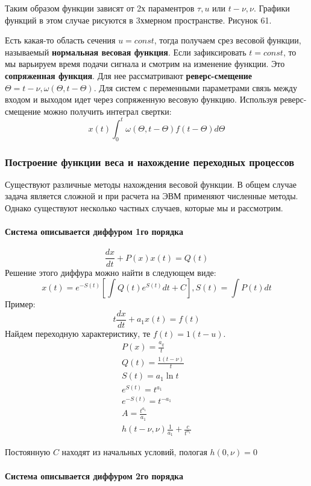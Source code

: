 Таким образом функции зависят от 2х параментров $\tau,
u$ или $t-\nu,\nu$. Графики функций в этом случае рисуются в 3хмерном пространстве.
Рисунок 61.

Есть какая-то область сечения $
u=const$, тогда получаем срез весовой функции, называемый \textbf{нормальная весовая функция}. Если зафиксировать $t=const$, то мы варьируем время подачи сигнала и смотрим на изменение функции. Это \textbf{сопряженная функция}. Для нее рассматривают \textbf{реверс-смещение} $\Theta=t-\nu, \omega(\Theta,t-\Theta)$. Для систем с переменными параметрами связь между входом и выходом идет через сопряженную весовую функцию. Используя реверс-смещение можно получить интеграл свертки:
$$
	x(t)\int^t_0\omega(\Theta,t-\Theta)f(t-\Theta)d\Theta
$$

\subsubsection{Построение функции веса и нахождение переходных процессов}
Существуют различные методы нахождения весовой функции. В общем случае задача является сложной и при расчета на ЭВМ применяют численные методы. Однако существуют несколько частных случаев, которые мы и рассмотрим.
\paragraph{Система описывается диффуром 1го порядка}

$$
	\frac{dx}{dt}+P(x)x(t)=Q(t)
$$
Решение этого диффура можно найти в следующем виде:
$$
	x(t)=e^{-S(t)}[\int{}Q(t)e^{S(t)}dt+C], S(t)=\int{}P(t)dt
$$
Пример:
$$
	t\frac{dx}{dt}+a_1x(t)=f(t)
$$
Найдем переходную характеристику, те $f(t)=1(t-
u)$.
\begin{align*}
	P(x) = \frac{a_q}t \\
	Q(t) = \frac{1(t-\nu)}t \\
	S(t) = a_1\ln{}t \\
	e^{S(t)} = t^{a_1} \\
	e^{-S(t)} = t^{-a_1} \\
	A = \frac{t^{a_1}}{a_1} \\
	h(t-\nu,\nu)\frac1{a_1}+\frac{c}{t^{a_1}}
\end{align*}

Постоянную $C$ находят из начальных условий, пологая $h(0, \nu)=0$

\paragraph{Система описывается диффуром 2го порядка}

